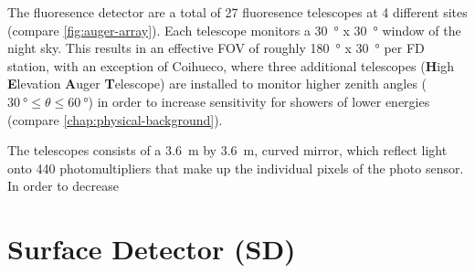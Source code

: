 The fluoresence detector are a total of 27 fluoresence telescopes at 4 different sites (compare \autoref{fig:auger-array}). Each telescope
monitors a \SI{30}{\degree} x \SI{30}{\degree} window of the night sky. This results in an effective FOV of roughly \SI{180}{\degree} x 
\SI{30}{\degree} per FD station, with an exception of Coihueco, where three additional telescopes (\textbf{H}igh \textbf{E}levation \textbf{A}uger
\textbf{T}elescope) are installed to monitor higher zenith angles ($\SI{30}{\degree}\leq\theta\leq\SI{60}{\degree}$) in order to increase
sensitivity for showers of lower energies (compare \autoref{chap:physical-background}).

The telescopes consists of a \SI{3.6}{\meter} by \SI{3.6}{\meter}, curved mirror, which reflect light onto 440 photomultipliers that make up the 
individual pixels of the photo sensor. In order to decrease 

\section{Surface Detector (SD)}
\label{sec:surface-detector}


